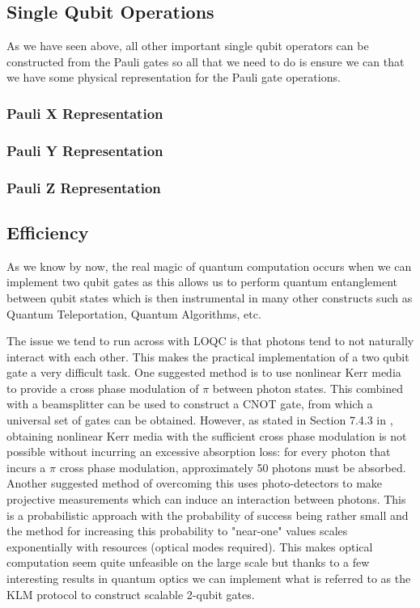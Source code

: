 
\subsection{Single Qubit Operations}
As we have seen above, all other important single qubit operators can be constructed from the Pauli gates so all that we need to do is ensure we can that we have some physical representation for the Pauli gate operations.
\subsubsection{Pauli X Representation}
\subsubsection{Pauli Y Representation}
\subsubsection{Pauli Z Representation}


\subsection{Efficiency}
As we know by now, the real magic of quantum computation occurs when we can implement two qubit gates as this allows us to perform quantum entanglement between qubit states which is then instrumental in many other constructs such as Quantum Teleportation, Quantum Algorithms, etc.

The issue we tend to run across with LOQC is that photons tend to not naturally interact with each other. This makes the practical implementation of a two qubit gate a very difficult task. One suggested method is to use nonlinear Kerr media to provide a cross phase modulation of $\pi$ between photon states. This combined with a beamsplitter can be used to construct a CNOT gate, from which a universal set of gates can be obtained. However, as stated in Section 7.4.3 in \cite{nielsen_chuang_2010}, obtaining nonlinear Kerr media with the sufficient cross phase modulation is not possible without incurring an excessive absorption loss: for every photon that incurs a $\pi$ cross phase modulation, approximately 50 photons must be absorbed. Another suggested method of overcoming this uses photo-detectors to make projective measurements which can induce an interaction between photons\cite{Kok:2005jip}. This is a probabilistic approach with the probability of success being rather small and the method for increasing this probability to "near-one" values scales exponentially with resources (optical modes required). This makes optical computation seem quite unfeasible on the large scale but thanks to a few interesting results in quantum optics we can implement what is referred to as the KLM protocol to construct scalable 2-qubit gates.


